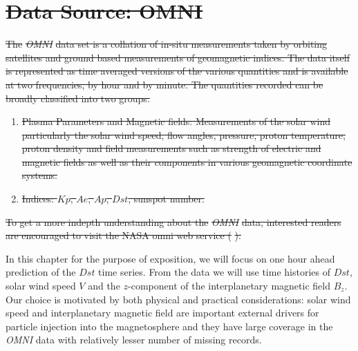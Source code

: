 \documentclass{article}
\providecommand{\DIFdel}[1]{{\protect\color{red}\sout{#1}}}                      %
\providecommand{\DIFdelbegin}{} %
\providecommand{\DIFdelend}{} %
\newcommand{\DIFscaledelfig}{0.5}
\newlength{\DIFdelgraphicswidth} %
\newlength{\DIFdelgraphicsheight} %
\newcommand{\DIFdelincludegraphics}[2][]{%
\sbox{\DIFdelgraphicsbox}{\DIFOincludegraphics[#1]{#2}}%
\settoboxwidth{\DIFdelgraphicswidth}{\DIFdelgraphicsbox} %
\settoboxtotalheight{\DIFdelgraphicsheight}{\DIFdelgraphicsbox} %
\scalebox{\DIFscaledelfig}{%
\parbox[b]{\DIFdelgraphicswidth}{\usebox{\DIFdelgraphicsbox}\\[-\baselineskip] \rule{\DIFdelgraphicswidth}{0em}}\llap{\resizebox{\DIFdelgraphicswidth}{\DIFdelgraphicsheight}{%
\setlength{\unitlength}{\DIFdelgraphicswidth}%
\begin{picture}(1,1)%
\thicklines\linethickness{2pt} %
{\color[rgb]{1,0,0}\put(0,0){\framebox(1,1){}}}%
{\color[rgb]{1,0,0}\put(0,0){\line( 1,1){1}}}%
{\color[rgb]{1,0,0}\put(0,1){\line(1,-1){1}}}%
\end{picture}%
}\hspace*{3pt}}} %
} %
\DeclareRobustCommand{\DIFdelbegin}{\DIFOdelbegin \let\includegraphics\DIFdelincludegraphics} %
\DeclareRobustCommand{\DIFdelend}{\DIFOaddend \let\includegraphics\DIFOincludegraphics} %
\begin{document}
\DIFdelbegin \section{\DIFdel{Data Source: OMNI}}
\addtocounter{section}{-1}%
\DIFdel{The }\emph{\DIFdel{OMNI}} %
\DIFdel{data set is a collation of in-situ measurements taken by orbiting satellites and ground based measurements of geomagnetic indices. The data itself is represented as time averaged versions of the various quantities and is available at two frequencies, by hour and by minute. The quantities recorded can be broadly classified into two groups.
}%

\begin{enumerate}%

\item%
\DIFdel{Plasma Parameters and Magnetic fields: Measurements of the solar wind particularly the solar wind speed, flow angles, pressure, proton temperature, proton density and field measurements such as strength of electric and magnetic fields as well as their components in various geomagnetic coordinate systems.
  }%

\item%
\DIFdel{Indices: $Kp$, $Ae$, $Ap$, $Dst$, sunspot number.
  }%


\end{enumerate}%

\DIFdel{To get a more indepth understanding about the }\emph{\DIFdel{OMNI}} %
\DIFdel{data, interested readers are encouraged to visit the NASA omni web service (}%
\DIFdel{).
}%

\DIFdelend In this chapter for the purpose of exposition, we will focus on one
hour ahead prediction of the $Dst$ time series. From the data we will
use time histories of $Dst$, solar wind speed $V$ and the
$z$-component of the interplanetary magnetic field $B_z$. Our choice
is motivated by both physical and practical considerations: solar wind
speed and interplanetary magnetic field are important external drivers
for particle injection into the magnetosphere and they have large
coverage in the \emph{OMNI} data with relatively lesser number of
missing records.
\end{document}

